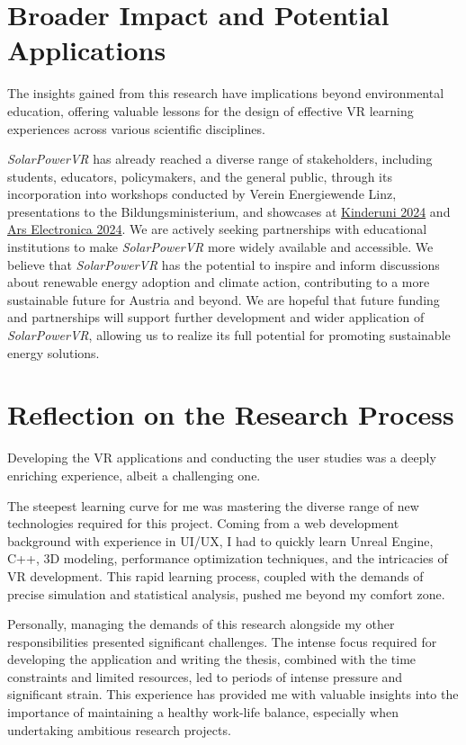 \documentclass[draft, final]{vutinfth} %
\begin{document}
\section{Broader Impact and Potential Applications}

The insights gained from this research have implications beyond environmental education, offering valuable lessons for the design of effective VR learning experiences across various scientific disciplines. 

\textit{SolarPowerVR} has already reached a diverse range of stakeholders, including students, educators, policymakers, and the general public, through its incorporation into workshops conducted by Verein Energiewende Linz, presentations to the Bildungsministerium, and showcases at \href{https://kinderuni.at/kinderuniwien/infos-und-termine/}{Kinderuni 2024} and \href{https://ars.electronica.art/hope/de/}{Ars Electronica 2024}. We are actively seeking partnerships with educational institutions to make \textit{SolarPowerVR} more widely available and accessible. We believe that \textit{SolarPowerVR} has the potential to inspire and inform discussions about renewable energy adoption and climate action, contributing to a more sustainable future for Austria and beyond. We are hopeful that future funding and partnerships will support further development and wider application of \textit{SolarPowerVR}, allowing us to realize its full potential for promoting sustainable energy solutions.

\section{Reflection on the Research Process}

Developing the VR applications and conducting the user studies was a deeply enriching experience, albeit a challenging one. 

The steepest learning curve for me was mastering the diverse range of new technologies required for this project. Coming from a web development background with experience in UI/UX, I had to quickly learn Unreal Engine, C++, 3D modeling, performance optimization techniques, and the intricacies of VR development. This rapid learning process, coupled with the demands of precise simulation and statistical analysis, pushed me beyond my comfort zone.

Personally, managing the demands of this research alongside my other responsibilities presented significant challenges. The intense focus required for developing the application and writing the thesis, combined with the time constraints and limited resources, led to periods of intense pressure and significant strain. This experience has provided me with valuable insights into the importance of maintaining a healthy work-life balance, especially when undertaking ambitious research projects.
\end{document}
